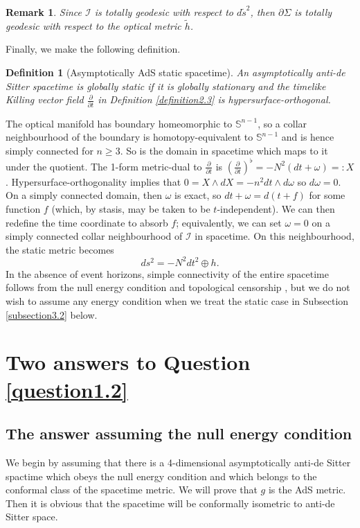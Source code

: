 \documentclass[12pt]{amsart}
\numberwithin{equation}{section}
\newtheorem{remark}[theorem]{Remark}
\newtheorem{definition}[theorem]{Definition}
\begin{document}
\begin{remark}\label{remark2.7}
Since ${\mathcal I}$ is totally geodesic with respect to $d{\tilde s}^2$, then $\partial \Sigma$ is totally geodesic with respect to the optical metric ${\tilde h}$.
\end{remark}

Finally, we make the following definition.
\begin{definition}[Asymptotically AdS static spacetime]\label{definition2.8}
An asymptotically anti-de Sitter spacetime is \emph{globally static} if it is globally stationary and the timelike Killing vector field $\frac{\partial}{\partial t}$ in Definition \ref{definition2.3} is hypersurface-orthogonal.
\end{definition}

The optical manifold has boundary homeomorphic to ${\mathbb S}^{n-1}$, so a collar neighbourhood of the boundary is homotopy-equivalent to ${\mathbb S}^{n-1}$ and is hence simply connected for $n\ge 3$. So is the domain in spacetime which maps to it under the quotient. The 1-form metric-dual to $\frac{\partial}{\partial t}$ is $\left ( \frac{\partial}{\partial t}\right )^{\flat} =-N^2\left ( dt+\omega\right )=:X$. Hypersurface-orthogonality implies that $0=X\wedge dX = -n^2 dt\wedge d\omega$ so $d\omega=0$. On a simply connected domain, then $\omega$ is exact, so $dt+\omega=d(t+f)$ for some function $f$ (which, by stasis, may be taken to be $t$-independent). We can then redefine the time coordinate to absorb $f$; equivalently, we can set $\omega=0$ on a simply connected collar neighbourhood of ${\mathcal I}$ in spacetime. On this neighbourhood, the static metric becomes
\begin{equation}
\label{eq2.2}
ds^2 =-N^2 dt^2 \oplus h .
\end{equation}
In the absence of event horizons, simple connectivity of the entire spacetime follows from the null energy condition and topological censorship \cite{Galloway, GSWW1, GSWW2}, but we do not wish to assume any energy condition when we treat the static case in Subsection \ref{subsection3.2} below.

\section{Two answers to Question \ref{question1.2}}\label{section3}

\subsection{The answer assuming the null energy condition}\label{subsection3.1}
We begin by assuming that there is a 4-dimensional asymptotically anti-de Sitter spactime which obeys the null energy condition and which belongs to the conformal class of the spacetime metric. We will prove that $g$ is the AdS metric. Then it is obvious that the spacetime will be conformally isometric to anti-de Sitter space.
\end{document}
